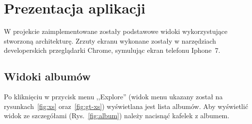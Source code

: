 \chapter{Prezentacja aplikacji}
	W projekcie zaimplementowane zostały podstawowe widoki wykorzystujące stworzoną architekturę.
	Zrzuty ekranu wykonane zostały w narzędziach developerskich przeglądarki Chrome, symulując ekran telefonu Iphone~7.

\section{Widoki albumów}
	Po kliknięciu w przycisk menu ,,Explore'' (widok menu ukazany został na rysunkach~\ref{fig:xs} oraz~\ref{fig:gt-xs}) wyświetlana jest lista albumów.
	Aby wyświetlić widok ze szczegółami (Rys.~\ref{fig:album}) należy nacisnąć kafelek z albumem.
